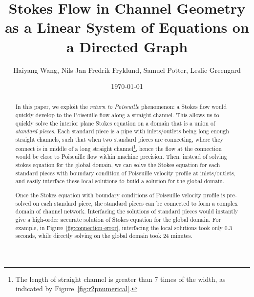 \documentclass[10pt,twocolumn,letterpaper]{article}
\author{Haiyang Wang, Nils Jan Fredrik Fryklund, Samuel Potter, Leslie Greengard}
\date{\today}
\title{Stokes Flow in Channel Geometry as a Linear System of Equations on a Directed Graph}
\begin{document}
\maketitle

\begin{abstract}
  In this paper, we exploit the \textit{return to Poiseuille} phenomenon:
  a Stokes flow would quickly develop to the Poiseuille flow along a straight channel.
  This allows us to quickly solve the interior plane Stokes equation
  on a domain that is a union of \textit{standard pieces}.
  Each standard piece is a pipe with inlets/outlets
  being long enough straight channels, 
  such that when two standard pieces are connecting,
  where they connect is in middle of a long
  straight channel\footnote{
    The length of straight channel is greater than 7 times of the width,
    as indicated by Figure~\ref{fig:r2pnumerical}.}, 
  hence the flow at the connection would be close to Poiseuille flow 
  within machine precision.
  Then, instead of solving stokes equation for the global domain,
  we can solve the Stokes equation
  for each standard pieces with boundary condition of Poiseuille velocity profile at inlets/outlets,
  and easily interface these local solutions to build a solution for the global domain.

  Once the Stokes equation with boundary conditions 
  of Poiseuille velocity profile is pre-solved on each standard piece, 
  the standard pieces can be connected to form 
  a complex domain of channel network. 
  Interfacing the solutions of standard pieces would instantly give 
  a high-order accurate solution of Stokes equation for the global domain. 
  For example, in Figure~\ref{fig:connection-error}, 
  interfacing the local solutions took only 0.3 seconds, 
  while directly solving on the global domain took 24 minutes.
\end{abstract}
\end{document}
